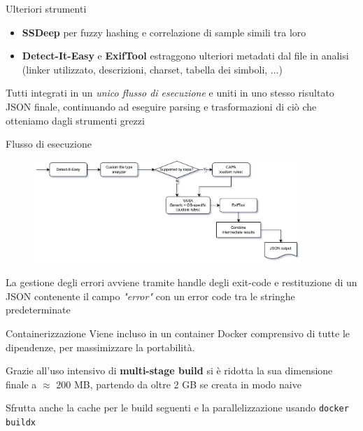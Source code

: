 \begin{frame}{Ulteriori strumenti}
\begin{itemize}
    \item \textbf{SSDeep} per fuzzy hashing e correlazione di sample simili tra loro
    \item \textbf{Detect-It-Easy} e \textbf{ExifTool} estraggono ulteriori metadati dal file in analisi (linker utilizzato, descrizioni, charset, tabella dei simboli, ...)
\end{itemize}

\vfill

Tutti integrati in un \emph{unico flusso di esecuzione} e uniti in uno stesso risultato JSON finale, continuando ad eseguire parsing e trasformazioni di ciò che otteniamo dagli strumenti grezzi
\end{frame}

\begin{frame}{Flusso di esecuzione}
\begin{figure}
    \centering
    \includegraphics[width=0.9\textwidth]{images/static_run_analysis_internal_tools.png}
\end{figure}
La gestione degli errori avviene tramite handle degli exit-code e restituzione di un JSON contenente il campo \emph{"error"} con un error code tra le stringhe predeterminate
\end{frame}

\begin{frame}{Containerizzazione}
Viene incluso in un container Docker comprensivo di tutte le dipendenze, per massimizzare la portabilità.

Grazie all'uso intensivo di \textbf{multi-stage build} si è ridotta la sua dimensione finale a $\approx$ 200 MB, partendo da oltre 2 GB se creata in modo naive

Sfrutta anche la cache per le build seguenti e la parallelizzazione usando \texttt{docker buildx}
\end{frame}

